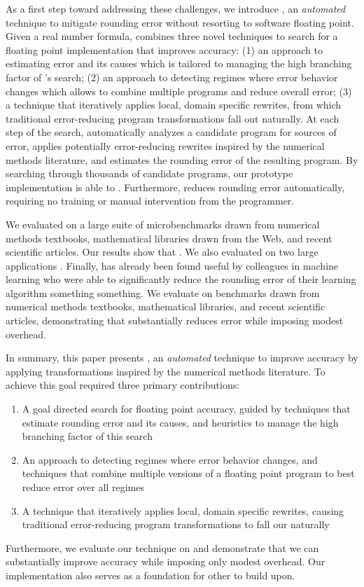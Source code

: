 \documentclass[paper.tex]{subfiles}
\begin{document}
As a first step toward addressing these challenges, we introduce
\casio, an \textit{automated} technique to mitigate rounding error
without resorting to software floating point.  Given a real number
formula, \casio combines three novel techniques to search for a
floating point implementation that improves accuracy: (1) an approach
to estimating error and its causes which is tailored to managing the
high branching factor of \casio's search; (2) an approach to detecting
regimes where error behavior changes which allows \casio to combine
multiple programs and reduce overall error; (3) a technique that
iteratively applies local, domain specific rewrites, from which
traditional error-reducing program transformations fall out naturally.
At each step of the search, \casio automatically analyzes a candidate
program for sources of error, applies potentially error-reducing
rewrites inspired by the numerical methods literature, and estimates
the rounding error of the resulting program.  By searching through
thousands of candidate programs, our prototype implementation is able
to .  Furthermore, \casio
reduces rounding error automatically, requiring no training or manual
intervention from the programmer.

We evaluated \casio on a large suite of microbenchmarks drawn from
numerical methods textbooks, mathematical libraries drawn from the
Web, and recent scientific articles.  Our results show that \casio
{}.  We also evaluated \casio on two large applications
.  Finally, \casio has already been found useful by
colleagues in machine learning who were able to significantly reduce
the rounding error of their learning algorithm something something.
We evaluate \casio on benchmarks drawn from numerical methods
textbooks, mathematical libraries, and recent scientific articles,
demonstrating that \casio substantially reduces error while imposing
modest overhead.

In summary, this paper presents \casio, an \textit{automated}
technique to improve accuracy by applying transformations inspired by
the numerical methods literature. To achieve this goal required three
primary contributions:
\begin{enumerate}
\item A goal directed search for floating point accuracy, guided by
  techniques that estimate rounding error and its causes,
  and heuristics to manage the high branching factor of this search
\item An approach to detecting regimes where error behavior changes,
  and techniques that combine multiple versions of a floating point
  program to best reduce error over all regimes
\item A technique that iteratively applies local, domain specific rewrites,
  causing traditional error-reducing program transformations
  to fall our naturally
\end{enumerate}
Furthermore, we evaluate our technique on  and demonstrate that we can substantially improve
accuracy while imposing only modest overhead.  Our implementation also
serves as a foundation for other to build upon.
\end{document}
